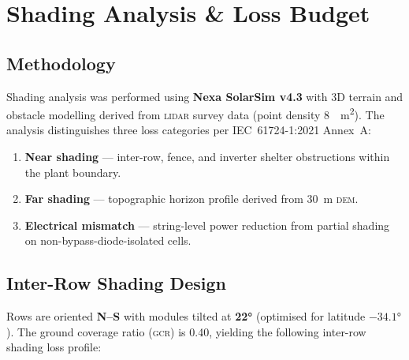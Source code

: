 
\section{Shading Analysis \& Loss Budget}

\subsection{Methodology}

Shading analysis was performed using \textbf{Nexa SolarSim v4.3} with 3D terrain and obstacle
modelling derived from \textsc{lidar} survey data (point density \SI{8}{\per\meter\squared}).
The analysis distinguishes three loss categories per IEC~61724-1:2021 Annex~A:

\begin{enumerate}[leftmargin=1.6em, itemsep=3pt, label=\lbrack\arabic*\rbrack]
  \item \textbf{Near shading} — inter-row, fence, and inverter shelter obstructions within
        the plant boundary.
  \item \textbf{Far shading} — topographic horizon profile derived from 30~m \textsc{dem}.
  \item \textbf{Electrical mismatch} — string-level power reduction from partial shading
        on non-bypass-diode-isolated cells.
\end{enumerate}

\subsection{Inter-Row Shading Design}

Rows are oriented \textbf{N--S} with modules tilted at \textbf{22°} (optimised for
latitude $-34.1°$). The ground coverage ratio (\textsc{gcr}) is 0.40, yielding the
following inter-row shading loss profile:

